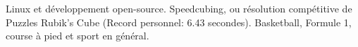 \documentclass[10pt,a4paper]{article} %
\begin{document}

\spacedhrule{1.6em}{-0.4em} %


{Linux et développement open-source. Speedcubing, ou résolution compétitive de Puzzles Rubik's Cube (Record personnel: 6.43 secondes). Basketball, Formule 1, course à pied et sport en général.}

\end{document}
